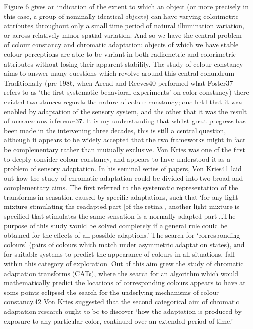 Figure 6 gives an indication of the extent to which an object (or more precisely in this case, a group of nominally identical objects) can have varying colorimetric attributes throughout only a small time period of natural illumination variation, or across relatively minor spatial variation.
And so we have the central problem of colour constancy and chromatic adaptation: objects of which we have stable colour perceptions are able to be variant in both radiometric and colorimetric attributes without losing their apparent stability. The study of colour constancy aims to answer many questions which revolve around this central conundrum. Traditionally (pre-1986, when Arend and Reeves40 performed what Foster37 refers to as `the first systematic behavioral experiments' on color constancy) there existed two stances regards the nature of colour constancy; one held that it was enabled by adaptation of the sensory system, and the other that it was the result of unconscious inference37. It is my understanding that whilst great progress has been made in the intervening three decades, this is still a central question, although it appears to be widely accepted that the two frameworks might in fact be complementary rather than mutually exclusive. 
Von Kries was one of the first to deeply consider colour constancy, and appears to have understood it as a problem of sensory adaptation. In his seminal series of papers, Von Kries41 laid out how the study of chromatic adaptation could be divided into two broad and complementary aims. 
The first referred to the systematic representation of the transforms in sensation caused by specific adaptations, such that `for any light mixture stimulating the readapted part [of the retina], another light mixture is specified that stimulates the same sensation is a normally adapted part \dots The purpose of this study would be solved completely if a general rule could be obtained for the effects of all possible adaptions.' The search for `corresponding colours' (pairs of colours which match under asymmetric adaptation states), and for suitable systems to predict the appearance of colours in all situations, fall within this category of exploration. Out of this aim grew the study of chromatic adaptation transforms (CATs), where the search for an algorithm which would mathematically predict the locations of corresponding colours appears to have at some points eclipsed the search for the underlying mechanisms of colour constancy.42
Von Kries suggested that the second categorical aim of chromatic adaptation research ought to be to discover `how the adaptation is produced by exposure to any particular color, continued over an extended period of time.' 
